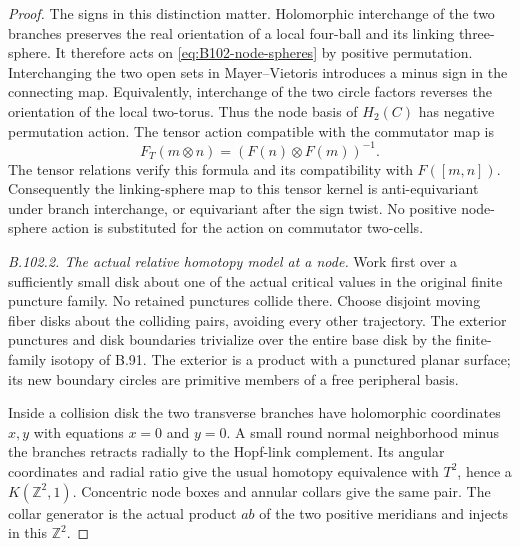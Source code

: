 \begin{proof}
The signs in this distinction matter. Holomorphic interchange of
the two branches preserves the real orientation of a local
four-ball and its linking three-sphere. It therefore acts on
\eqref{eq:B102-node-spheres} by positive permutation. Interchanging
the two open sets in Mayer--Vietoris introduces a minus sign in
the connecting map. Equivalently, interchange of the two circle
factors reverses the orientation of the local two-torus. Thus the
node basis of $H_2(C)$ has negative permutation action. The tensor
action compatible with the commutator map is
\[
             F_T(m\otimes n)=(F(n)\otimes F(m))^{-1}.
\]
The tensor relations verify this formula and its compatibility
with $F([m,n])$. Consequently the linking-sphere map to this
tensor kernel is anti-equivariant under branch interchange,
or equivariant after the sign twist. No positive node-sphere
action is substituted for the action on commutator two-cells.

\emph{B.102.2. The actual relative homotopy model at a node.}
Work first over a sufficiently small disk about one of the actual
critical values in the original finite puncture family. No retained
punctures collide there. Choose disjoint moving fiber disks about
the colliding pairs, avoiding every other trajectory. The exterior
punctures and disk boundaries trivialize over the entire base disk
by the finite-family isotopy of B.91. The exterior is a product
with a punctured planar surface; its new boundary circles are
primitive members of a free peripheral basis.

Inside a collision disk the two transverse branches have holomorphic
coordinates $x,y$ with equations $x=0$ and $y=0$. A small round
normal neighborhood minus the branches retracts radially to the
Hopf-link complement. Its angular coordinates and radial ratio
give the usual homotopy equivalence with $T^2$, hence a
$K(\mathbb Z^2,1)$. Concentric node boxes and annular collars give
the same pair. The collar generator is the actual product $ab$
of the two positive meridians and injects in this $\mathbb Z^2$.


\end{proof}
